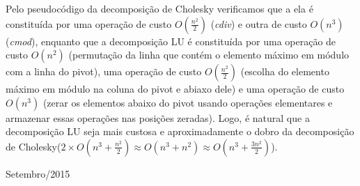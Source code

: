 \documentclass[a4paper,11pt]{article}
\begin{document}
Pelo pseudocódigo da decomposição de Cholesky verificamos que a ela é constituída por uma operação de custo $O(\frac{n^{2}}{2})$ ({\it cdiv}) e outra de custo $O(n^{3})$ ({\it cmod}), enquanto que a decomposição LU é constituída por uma operação de custo $O(n^{2})$ (permutação da linha que contém o elemento máximo em módulo com a linha do pivot), uma operação de custo $O(\frac{n^{2}}{2})$ (escolha do elemento máximo em módulo na coluna do pivot e abiaxo dele) e uma operação de custo $O(n^{3})$ (zerar os elementos abaixo do pivot usando operações elementares e armazenar essas operações nas posições zeradas). Logo, é natural que a decomposição LU seja mais custosa e aproximadamente o dobro da decomposição de Cholesky($2 \times O(n^{3}+\frac{n^{2}}{2}) \approx O(n^{3}+n^{2}) \approx O(n^{3}+\frac{3n^{2}}{2}) $). 

\vfill

\raggedleft
{\sc Setembro/2015}
\end{document}
